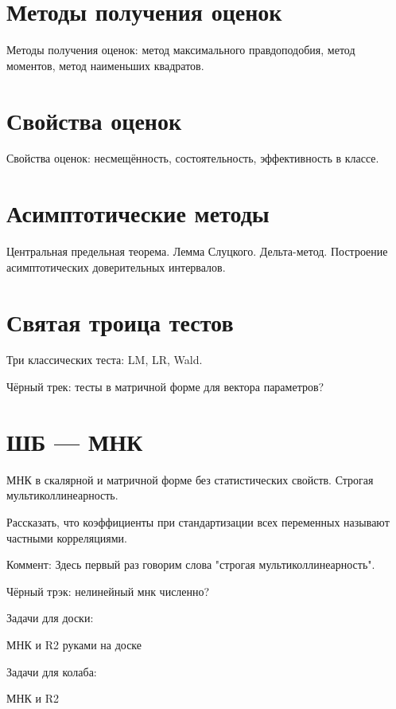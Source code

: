 \documentclass[12pt]{article}
\begin{document}




\section{Методы получения оценок}

Методы получения оценок: метод максимального правдоподобия, метод моментов, метод наименьших квадратов.


\section{Свойства оценок}
Свойства оценок: несмещённость, состоятельность, эффективность в классе.


\section{Асимптотические методы}
Центральная предельная теорема. Лемма Слуцкого. Дельта-метод. Построение асимптотических доверительных интервалов.


\section{Святая троица тестов}
Три классических теста: LM, LR, Wald.


Чёрный трек: тесты в матричной форме для вектора параметров?

\section{ШБ — МНК}
МНК в скалярной и матричной форме без статистических свойств. Строгая мультиколлинеарность. 


Рассказать, что коэффициенты при стандартизации всех переменных называют частными корреляциями. 

Коммент: Здесь первый раз говорим слова "строгая мультиколлинеарность".

Чёрный трэк: нелинейный мнк численно?

Задачи для доски:

МНК и R2 руками на доске

Задачи для колаба:

МНК и R2
\end{document}
